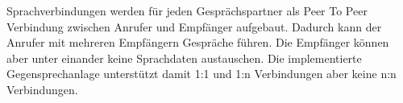Sprachverbindungen werden für jeden Gesprächspartner als Peer To Peer Verbindung zwischen Anrufer und Empfänger aufgebaut.
Dadurch kann der Anrufer mit mehreren Empfängern Gespräche führen.
Die Empfänger können aber unter einander keine Sprachdaten austauschen.
Die implementierte Gegensprechanlage unterstützt damit 1:1 und 1:n Verbindungen aber keine n:n Verbindungen.
